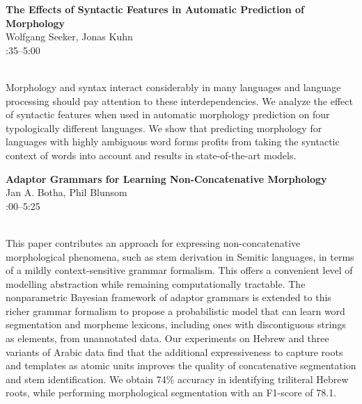 \documentclass[twoside,makeidx]{book}
\renewcommand{\normalsize}{\fontsize{8}{9}\selectfont}
\renewcommand{\small}{\fontsize{7}{8}\selectfont}
\begin{document}
\par\vspace{2em}\noindent%
\begin{minipage}{\linewidth}%
\begin{center}
\textbf{\normalsize The Effects of Syntactic Features in Automatic Prediction of Morphology}\\
\normalsize  Wolfgang Seeker,  Jonas Kuhn\\
{\small 4:35--5:00}\\
\end{center}
\end{minipage}\\[0.5em]
\nopagebreak%
\noindent%
{\small Morphology and syntax interact considerably in many languages and language processing should pay attention to these interdependencies. We analyze the effect of syntactic features when used in automatic morphology prediction on four  typologically different languages. We show that predicting morphology for languages with highly ambiguous word forms profits from taking the syntactic context of words into account and results in state-of-the-art models.}
\par\vspace{2em}\noindent%
\begin{minipage}{\linewidth}%
\begin{center}
\textbf{\normalsize Adaptor Grammars for Learning Non-Concatenative Morphology}\\
\normalsize  Jan A. Botha,  Phil Blunsom\\
{\small 5:00--5:25}\\
\end{center}
\end{minipage}\\[0.5em]
\nopagebreak%
\noindent%
{\small This paper contributes an approach for expressing non-concatenative morphological phenomena, such as stem derivation in Semitic languages, in terms of a mildly context-sensitive grammar formalism. This offers a convenient level of modelling abstraction while remaining computationally tractable. The nonparametric Bayesian framework of adaptor grammars is extended to this richer grammar formalism to propose a probabilistic model that can learn word segmentation and morpheme lexicons, including ones with discontiguous strings as elements, from unannotated data. Our experiments on Hebrew and three variants of Arabic data find that the additional expressiveness to capture roots and templates as atomic units improves the quality of concatenative segmentation and stem identification. We obtain 74\% accuracy in identifying triliteral Hebrew roots, while performing morphological segmentation with an F1-score of 78.1.}
\clearpage
\end{document}
